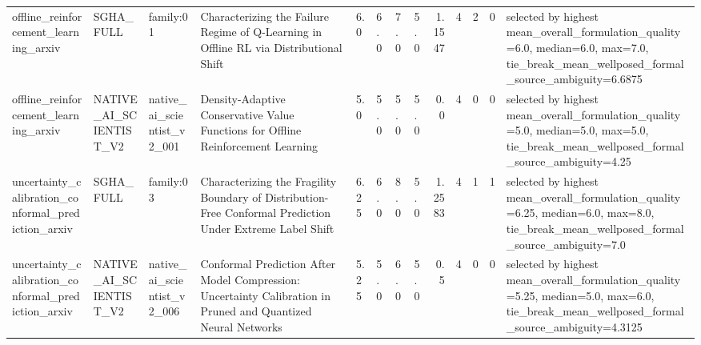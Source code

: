 \begin{table}[htbp]
\begin{tabular}{llllllllrrrrl}
offline\_reinforcement\_learning\_arxiv & SGHA\_FULL & family:01 & Characterizing the Failure Regime of Q-Learning in Offline RL via Distributional Shift & 6.0 & 6.0 & 7.0 & 5.0 & 1.1547 & 4 & 2 & 0 & selected by highest mean\_overall\_formulation\_quality=6.0, median=6.0, max=7.0, tie\_break\_mean\_wellposed\_formal\_source\_ambiguity=6.6875 \\
offline\_reinforcement\_learning\_arxiv & NATIVE\_AI\_SCIENTIST\_V2 & native\_ai\_scientist\_v2\_001 & Density-Adaptive Conservative Value Functions for Offline Reinforcement Learning & 5.0 & 5.0 & 5.0 & 5.0 & 0.0 & 4 & 0 & 0 & selected by highest mean\_overall\_formulation\_quality=5.0, median=5.0, max=5.0, tie\_break\_mean\_wellposed\_formal\_source\_ambiguity=4.25 \\
uncertainty\_calibration\_conformal\_prediction\_arxiv & SGHA\_FULL & family:03 & Characterizing the Fragility Boundary of Distribution-Free Conformal Prediction Under Extreme Label Shift & 6.25 & 6.0 & 8.0 & 5.0 & 1.2583 & 4 & 1 & 1 & selected by highest mean\_overall\_formulation\_quality=6.25, median=6.0, max=8.0, tie\_break\_mean\_wellposed\_formal\_source\_ambiguity=7.0 \\
uncertainty\_calibration\_conformal\_prediction\_arxiv & NATIVE\_AI\_SCIENTIST\_V2 & native\_ai\_scientist\_v2\_006 & Conformal Prediction After Model Compression: Uncertainty Calibration in Pruned and Quantized Neural Networks & 5.25 & 5.0 & 6.0 & 5.0 & 0.5 & 4 & 0 & 0 & selected by highest mean\_overall\_formulation\_quality=5.25, median=5.0, max=6.0, tie\_break\_mean\_wellposed\_formal\_source\_ambiguity=4.3125 \\
\bottomrule
\end{tabular}
\end{table}
